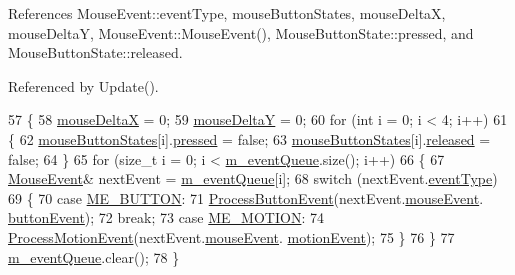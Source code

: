 References Mouse\+Event\+::event\+Type, mouse\+Button\+States, mouse\+DeltaX, mouse\+DeltaY, Mouse\+Event\+::\+Mouse\+Event(), Mouse\+Button\+State\+::pressed, and Mouse\+Button\+State\+::released.



Referenced by Update().


\begin{DoxyCode}
57 \{
58   \hyperlink{class_g_l_input_handler_a2e7df62a21583ccbfcbc9ad3073c2200}{mouseDeltaX} = 0;
59   \hyperlink{class_g_l_input_handler_a9f02e037ae5162dbd73f14be2961b767}{mouseDeltaY} = 0;
60   \textcolor{keywordflow}{for} (\textcolor{keywordtype}{int} i = 0; i < 4; i++)
61   \{
62     \hyperlink{class_g_l_input_handler_a55300deac5e92292e389fdffb8403c39}{mouseButtonStates}[i].\hyperlink{struct_mouse_button_state_ae428b125228d89509b7cd0252de7afc8}{pressed} = \textcolor{keyword}{false};
63     \hyperlink{class_g_l_input_handler_a55300deac5e92292e389fdffb8403c39}{mouseButtonStates}[i].\hyperlink{struct_mouse_button_state_a229af718ec1b3105452ecb237f35d502}{released} = \textcolor{keyword}{false};
64   \}
65   \textcolor{keywordflow}{for} (\textcolor{keywordtype}{size\_t} i = 0; i < \hyperlink{class_g_l_input_handler_ada1ba238aee9b9d4e40cbd8e6dcde471}{m\_eventQueue}.size(); i++)
66   \{
67     \hyperlink{struct_mouse_event}{MouseEvent}& nextEvent = \hyperlink{class_g_l_input_handler_ada1ba238aee9b9d4e40cbd8e6dcde471}{m\_eventQueue}[i];
68     \textcolor{keywordflow}{switch} (nextEvent.\hyperlink{struct_mouse_event_ae6bdad847363f462a57f8be893fd620c}{eventType})
69     \{
70       \textcolor{keywordflow}{case} \hyperlink{_g_l_input_handler_8h_aeb86fa74ca9837fffb1d216966d74e0fab4c0d54194bfe0f4f3c16c25161757db}{ME\_BUTTON}:
71         \hyperlink{class_g_l_input_handler_aea8183a10d96367e27aea703b7c4ee04}{ProcessButtonEvent}(nextEvent.\hyperlink{struct_mouse_event_a75d3e0b8d1c30db9650221cf0769704d}{mouseEvent}.
      \hyperlink{union_s_d_l___m_o_u_s_e___e_v_e_n_t_ad50a05e3e7614096226545a17674b21e}{buttonEvent});
72         \textcolor{keywordflow}{break};
73       \textcolor{keywordflow}{case} \hyperlink{_g_l_input_handler_8h_aeb86fa74ca9837fffb1d216966d74e0fab88552d2119ce3914095501fe17f5762}{ME\_MOTION}:
74         \hyperlink{class_g_l_input_handler_ad7eac3e702846fe306fe4e712f4047f2}{ProcessMotionEvent}(nextEvent.\hyperlink{struct_mouse_event_a75d3e0b8d1c30db9650221cf0769704d}{mouseEvent}.
      \hyperlink{union_s_d_l___m_o_u_s_e___e_v_e_n_t_af8459d7e4e5e53b2caf6e39db087f17c}{motionEvent});
75     \}
76   \}
77   \hyperlink{class_g_l_input_handler_ada1ba238aee9b9d4e40cbd8e6dcde471}{m\_eventQueue}.clear();
78 \}
\end{DoxyCode}


